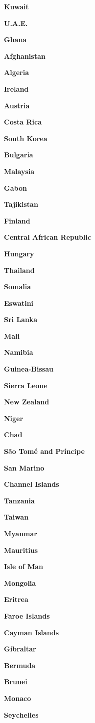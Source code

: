 \textbf{Kuwait}

\textbf{U.A.E.}

\textbf{Ghana}

\textbf{Afghanistan}

\textbf{Algeria}

\textbf{Ireland}

\textbf{Austria}

\textbf{Costa Rica}

\textbf{South Korea}

\textbf{Bulgaria}

\textbf{Malaysia}

\textbf{Gabon}

\textbf{Tajikistan}

\textbf{Finland}

\textbf{Central African Republic}

\textbf{Hungary}

\textbf{Thailand}

\textbf{Somalia}

\textbf{Eswatini}

\textbf{Sri Lanka}

\textbf{Mali}

\textbf{Namibia}

\textbf{Guinea-Bissau}

\textbf{Sierra Leone}

\textbf{New Zealand}

\textbf{Niger}

\textbf{Chad}

\textbf{São Tomé and Príncipe}

\textbf{San Marino}

\textbf{Channel Islands}

\textbf{Tanzania}

\textbf{Taiwan}

\textbf{Myanmar}

\textbf{Mauritius}

\textbf{Isle of Man}

\textbf{Mongolia}

\textbf{Eritrea}

\textbf{Faroe Islands}

\textbf{Cayman Islands}

\textbf{Gibraltar}

\textbf{Bermuda}

\textbf{Brunei}

\textbf{Monaco}

\textbf{Seychelles}

